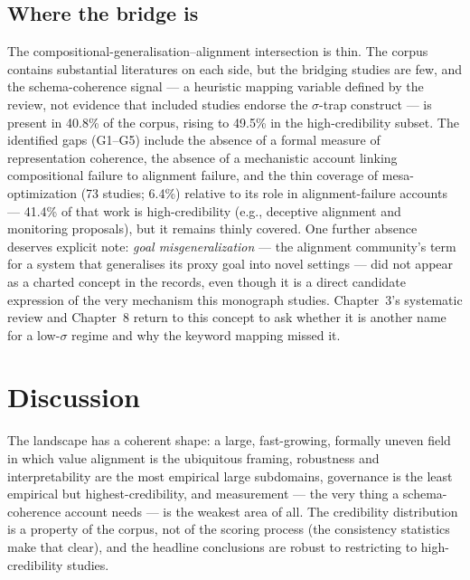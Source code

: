 \subsection{Where the bridge is}

The compositional-generalisation--alignment intersection is thin. The corpus contains
substantial literatures on each side, but the bridging studies are few, and the
schema-coherence signal --- a heuristic mapping variable defined by the review, not
evidence that included studies endorse the $\sigma$-trap construct --- is present in
40.8\% of the corpus, rising to 49.5\% in the high-credibility subset. The identified
gaps (G1--G5) include the absence of a formal measure of representation coherence, the
absence of a mechanistic account linking compositional failure to alignment failure,
and the thin coverage of mesa-optimization (73 studies; 6.4\%) relative to its role in
alignment-failure accounts --- 41.4\% of that work is high-credibility (e.g., deceptive
alignment and monitoring proposals), but it remains thinly covered. One further absence
deserves explicit note: \emph{goal misgeneralization} --- the alignment community's term
for a system that generalises its proxy goal into novel settings
\citep{langosco2022goal} --- did not appear as a charted concept in the records, even
though it is a direct candidate expression of the very mechanism this monograph studies.
Chapter~3's systematic review and Chapter~8 return to this concept to ask whether it is
another name for a low-$\sigma$ regime and why the keyword mapping missed it.

\section{Discussion}

The landscape has a coherent shape: a large, fast-growing, formally uneven field in
which value alignment is the ubiquitous framing, robustness and interpretability are
the most empirical large subdomains, governance is the least empirical but
highest-credibility, and measurement --- the very thing a schema-coherence account
needs --- is the weakest area of all. The credibility distribution is a property of the
corpus, not of the scoring process (the consistency statistics make that clear), and
the headline conclusions are robust to restricting to high-credibility studies.

